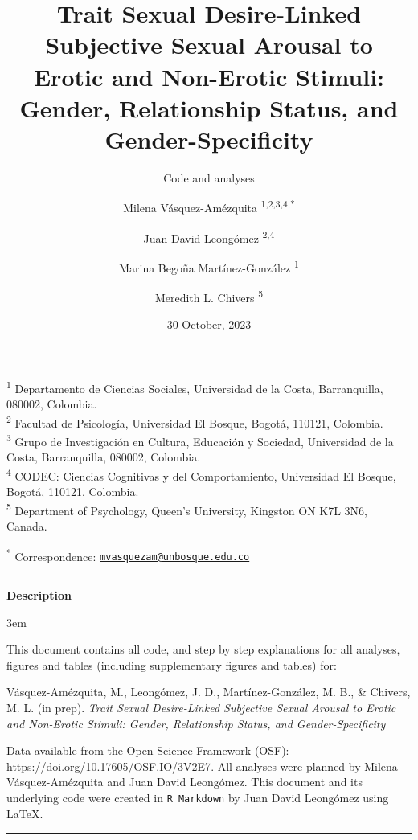 \documentclass[
  bookmarksnumbered]{article}
\title{Trait Sexual Desire-Linked Subjective Sexual Arousal to Erotic and Non-Erotic Stimuli: Gender, Relationship Status, and Gender-Specificity}
\subtitle{Code and analyses}
\author{Milena Vásquez-Amézquita \orcidlink{0000-0001-7317-8430}\textsuperscript{1,2,3,4,*} \and Juan David Leongómez \orcidlink{0000-0002-0092-6298}\textsuperscript{2,4} \and Marina Begoña Martínez-González \orcidlink{0000-0002-5840-6383}\textsuperscript{1} \and Meredith L. Chivers \orcidlink{0000-0002-5495-9263}\textsuperscript{5}}
\date{30 October, 2023}
\begin{document}
\maketitle

\textsuperscript{1} Departamento de Ciencias Sociales, Universidad de la Costa, Barranquilla, 080002, Colombia.\\
\textsuperscript{2} Facultad de Psicología, Universidad El Bosque, Bogotá, 110121, Colombia.\\
\textsuperscript{3} Grupo de Investigación en Cultura, Educación y Sociedad, Universidad de la Costa, Barranquilla, 080002, Colombia.\\
\textsuperscript{4} CODEC: Ciencias Cognitivas y del Comportamiento, Universidad El Bosque, Bogotá, 110121, Colombia.\\
\textsuperscript{5} Department of Psychology, Queen's University, Kingston ON K7L 3N6, Canada.

\textsuperscript{*} Correspondence: \href{mailto:mvasquezam@unbosque.edu.co}{\href{mailto:mvasquezam@unbosque.edu.co}{\nolinkurl{mvasquezam@unbosque.edu.co}}}

\begin{center}\rule{0.5\linewidth}{0.5pt}\end{center}

\begin{center}
\textbf{Description}
\end{center}

\par
\begingroup
\leftskip3em
\rightskip\leftskip

This document contains all code, and step by step explanations for all analyses, figures and tables (including supplementary figures and tables) for:

\begin{hangparas}{.25in}{1}
Vásquez-Amézquita, M., Leongómez, J. D., Martínez-González, M. B., \& Chivers, M. L. (in prep). \textit{Trait Sexual Desire-Linked Subjective Sexual Arousal to Erotic and Non-Erotic Stimuli: Gender, Relationship Status, and Gender-Specificity}
\end{hangparas}

Data available from the Open Science Framework (OSF): \url{https://doi.org/10.17605/OSF.IO/3V2E7}. All analyses were planned by Milena Vásquez-Amézquita and Juan David Leongómez. This document and its underlying code were created in \texttt{R\ Markdown} by Juan David Leongómez using \LaTeX.

\begin{center}\rule{0.5\linewidth}{0.5pt}\end{center}
\end{document}
